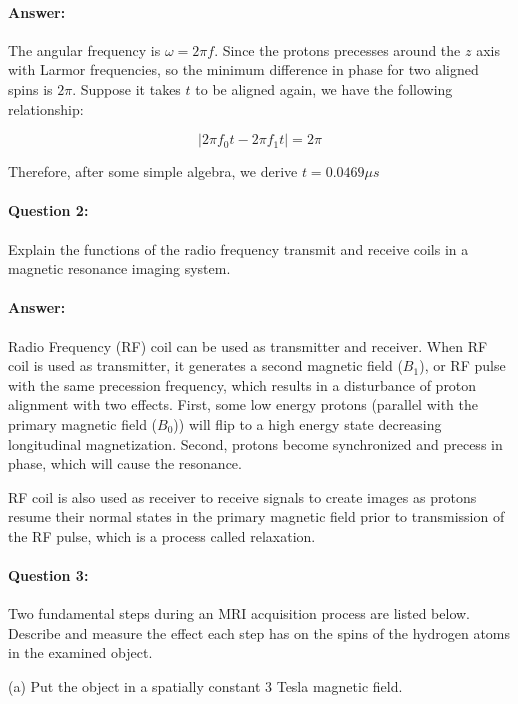 \documentclass[12pt, letter]{article}
\begin{document}
\paragraph{Answer: } The angular frequency is $\omega = 2\pi f$. Since the protons precesses around the $z$ axis with Larmor frequencies, so the
minimum difference in phase for two aligned spins is $2\pi$. Suppose it takes $t
$ to be aligned again, we have the following relationship:

\begin{equation}
    | 2\pi f_0t - 2\pi f_1t | = 2\pi
\end{equation}

Therefore, after some simple algebra, we derive $t=0.0469 \mu s$


\paragraph{Question 2: } Explain the functions of the radio frequency transmit and receive coils in a magnetic resonance imaging system.

\paragraph{Answer: } Radio Frequency (RF) coil can be used as transmitter and receiver. When RF coil is used as transmitter, it generates a second magnetic field ($B_1$), or RF pulse with the same precession frequency, which results in a disturbance of proton alignment with two effects. First, some low energy protons (parallel with the primary magnetic field ($B_0$)) will flip to a high energy state decreasing longitudinal magnetization. Second, protons become synchronized and precess in phase, which will cause the resonance. 

RF coil is also used as receiver to receive signals to create images as protons resume their normal states in the primary magnetic field prior to transmission of the RF pulse, which is a process called relaxation. 

\paragraph{Question 3: } Two fundamental steps during an MRI acquisition process are listed below. Describe and measure the effect each step has on the spins of the hydrogen atoms in the examined object.

(a) Put the object in a spatially constant 3 Tesla magnetic field.
\end{document}
